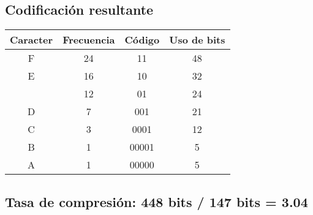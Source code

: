 \documentclass{article}
\begin{document}
\begin{center}
		\subsection*{Codificación resultante}
		\begin{tabular}{c|c|c|c}
			\textbf{Caracter} & \textbf{Frecuencia} & \textbf{Código} & \textbf{Uso de bits}\\
			\hline
			F & 24 & 11 & 48\\
			E & 16 & 10 & 32\\
			  & 12 & 01 & 24\\
			D & 7  & 001 & 21\\
			C & 3 & 0001 & 12\\
			B & 1 & 00001 & 5\\
			A & 1 & 00000 & 5\\ 
		\end{tabular}
		\subsection*{Tasa de compresión: 448 bits / 147 bits = 3.04}	
	\end{center}
	
\end{document}
